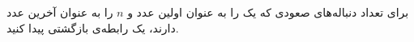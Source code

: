     \p 
برای تعداد دنباله‌های صعودی که یک را به عنوان اولین عدد و
$n$
را به عنوان آخرین عدد دارند، یک رابطه‌ی بازگشتی پیدا کنید.
